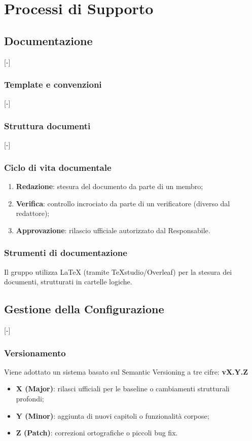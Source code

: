 \section{Processi di Supporto}

\subsection{Documentazione}
[-]

\subsubsection{Template e convenzioni}
[-]

\subsubsection{Struttura documenti}
[-]

\subsubsection{Ciclo di vita documentale}
\begin{enumerate}
	\item \textbf{Redazione}: stesura del documento da parte di un membro;
	\item \textbf{Verifica}: controllo incrociato da parte di un verificatore (diverso dal redattore);
	\item \textbf{Approvazione}: rilascio ufficiale autorizzato dal Responsabile.
\end{enumerate}

\subsubsection{Strumenti di documentazione}
Il gruppo utilizza LaTeX (tramite TeXstudio/Overleaf) per la stesura dei documenti, strutturati in cartelle logiche.

\subsection{Gestione della Configurazione}
[-]

\subsubsection{Versionamento}
Viene adottato un sistema basato sul Semantic Versioning a tre cifre: \textbf{vX.Y.Z}
\begin{itemize}
	\item \textbf{X (Major)}: rilasci ufficiali per le baseline o cambiamenti strutturali profondi;
	\item \textbf{Y (Minor)}: aggiunta di nuovi capitoli o funzionalità corpose;
	\item \textbf{Z (Patch)}: correzioni ortografiche o piccoli bug fix.
\end{itemize}

